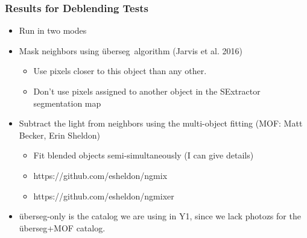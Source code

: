 \documentclass{beamer}
\newcommand{\uberseg}{{\"u}berseg}
\begin{document}
\frame
{

    \frametitle{Results for Deblending Tests}



    \begin{itemize}

        \item Run in two modes
        \item Mask neighbors using \uberseg\ algorithm (Jarvis et al. 2016)
            \begin{itemize}
                \item Use pixels closer to this object than any other.
                \item Don't use pixels assigned to another
                    object in the SExtractor segmentation map
            \end{itemize}

        \item Subtract the light from neighbors using the multi-object
            fitting (MOF: Matt Becker, Erin Sheldon)
            \begin{itemize}
                \item Fit blended objects semi-simultaneously (I can give details)
                \item https://github.com/esheldon/ngmix
                \item https://github.com/esheldon/ngmixer
            \end{itemize}

        \item \uberseg-only is the catalog we are using in Y1, since we
            lack photozs for the \uberseg+MOF catalog.

    \end{itemize}


}
\end{document}
